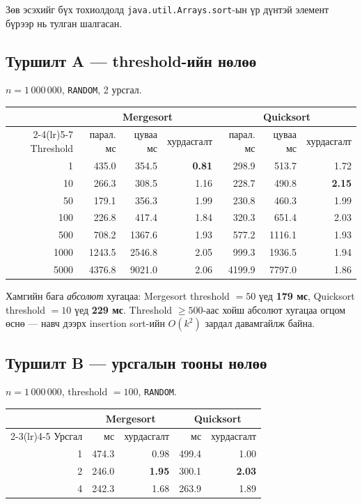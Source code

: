 \documentclass[11pt,a4paper]{article}
\begin{document}
Зөв эсэхийг бүх тохиолдолд \texttt{java.util.Arrays.sort}-ын үр дүнтэй
элемент бүрээр нь тулган шалгасан.

\subsection{Туршилт A --- threshold-ийн нөлөө}
$n = 1\,000\,000$, \texttt{RANDOM}, 2 урсгал.

\begin{center}
\small
\begin{tabular}{rrrrrrr}
\toprule
& \multicolumn{3}{c}{\textbf{Mergesort}} & \multicolumn{3}{c}{\textbf{Quicksort}} \\
\cmidrule(lr){2-4}\cmidrule(lr){5-7}
Threshold & парал. мс & цуваа мс & хурдасгалт & парал. мс & цуваа мс & хурдасгалт \\
\midrule
1    & 435.0  & 354.5  & \textbf{0.81} & 298.9  & 513.7  & 1.72 \\
10   & 266.3  & 308.5  & 1.16 & 228.7  & 490.8  & \textbf{2.15} \\
50   & 179.1  & 356.3  & 1.99 & 230.8  & 460.3  & 1.99 \\
100  & 226.8  & 417.4  & 1.84 & 320.3  & 651.4  & 2.03 \\
500  & 708.2  & 1367.6 & 1.93 & 577.2  & 1116.1 & 1.93 \\
1000 & 1243.5 & 2546.8 & 2.05 & 999.3  & 1936.5 & 1.94 \\
5000 & 4376.8 & 9021.0 & 2.06 & 4199.9 & 7797.0 & 1.86 \\
\bottomrule
\end{tabular}
\end{center}

Хамгийн бага \emph{абсолют} хугацаа: Mergesort threshold $=50$ үед
\textbf{179 мс}, Quicksort threshold $=10$ үед \textbf{229 мс}.
Threshold $\ge 500$-аас хойш абсолют хугацаа огцом өснө --- навч дээрх
insertion sort-ийн $O(k^2)$ зардал давамгайлж байна.

\subsection{Туршилт B --- урсгалын тооны нөлөө}
$n = 1\,000\,000$, threshold $= 100$, \texttt{RANDOM}.

\begin{center}
\small
\begin{tabular}{rrrrr}
\toprule
& \multicolumn{2}{c}{\textbf{Mergesort}} & \multicolumn{2}{c}{\textbf{Quicksort}} \\
\cmidrule(lr){2-3}\cmidrule(lr){4-5}
Урсгал & мс & хурдасгалт & мс & хурдасгалт \\
\midrule
1 & 474.3 & 0.98 & 499.4 & 1.00 \\
2 & 246.0 & \textbf{1.95} & 300.1 & \textbf{2.03} \\
4 & 242.3 & 1.68 & 263.9 & 1.89 \\
\bottomrule
\end{tabular}
\end{center}
\end{document}
